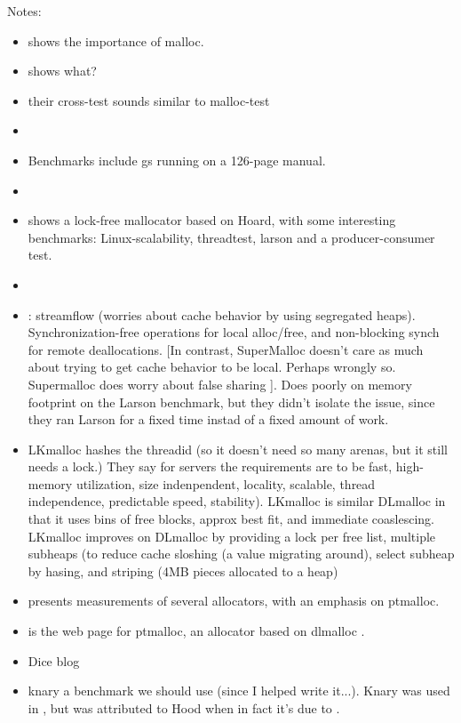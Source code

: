\documentclass[pldi]{sigplanconf-pldi15}
\begin{document}
Notes: 
\begin{itemize}
\item \cite{ReinefeldDoSc13} shows the importance of malloc.
\item \cite{Dementiev09} shows what?
\item \cite{KukanovVo07} their cross-test sounds similar to malloc-test
\item \cite{Vyukov08} 
\item \cite{DetlefsDoZo94} Benchmarks include gs running on a 126-page manual.
\item \cite{HudsonSaAd06}
\item \cite{Michael04} shows a lock-free mallocator based on Hoard, with some interesting benchmarks: Linux-scalability, threadtest, larson and a producer-consumer test.
\item \cite{FengBe05}
\item \cite{SchneiderAnNi06}: streamflow (worries about cache behavior by using segregated heaps).  Synchronization-free operations for local alloc/free, and non-blocking synch for remote deallocations.  [In contrast, SuperMalloc doesn't care as much about trying to get cache behavior to be local.  Perhaps wrongly so.  Supermalloc does worry about false sharing  ].  Does poorly on memory footprint on the Larson benchmark, but they didn't isolate the issue, since they ran Larson for a fixed time instad of a fixed amount of work.
\item \cite{LarsonKr98} LKmalloc hashes the threadid (so it doesn't need so many arenas, but it still needs a lock.)  They say for servers the requirements are to be fast, high-memory utilization, size indenpendent, locality, scalable, thread independence, predictable speed, stability).  LKmalloc is similar DLmalloc in that it uses bins of free blocks, approx best fit, and immediate coaslescing.  LKmalloc improves on DLmalloc by providing a lock per free list, multiple subheaps (to reduce cache sloshing (a value migrating around), select subheap by hasing, and striping (4MB pieces allocated to a heap)
\item \cite{Gloger12} presents measurements of several allocators, with an emphasis on ptmalloc.
\item \cite{Gloger06} is the web page for ptmalloc, an allocator based on dlmalloc \cite{Lea96}.
\item Dice blog
\item knary a benchmark we should use (since I helped write
  it...).  Knary was used in \cite{SchneiderAnNi06}, but was
  attributed to Hood when in fact it's due to \cite{BlumofeJoKu96}.
\end{itemize}
\end{document}
